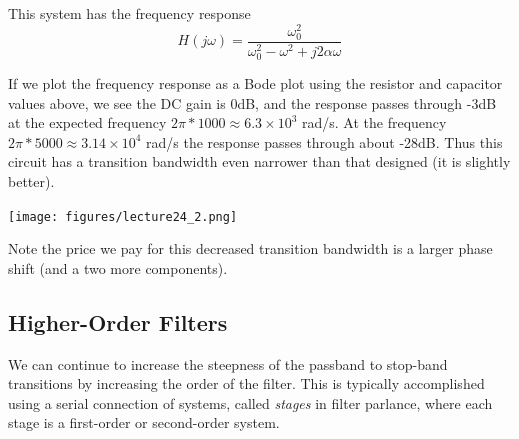 \begin{example}
\begin{center}
  \end{center}
  
  This system has the frequency response
    \[
  H(j\omega) = \frac{\omega_0^2}{\omega_0^2-\omega^2 + j2\alpha\omega}
  \]

  If we plot the frequency response as a Bode plot using the resistor and capacitor values above, we see the DC gain is 0dB, and the response passes through -3dB at the expected frequency $2\pi*1000 \approx 6.3\times 10^3$ rad/s. At the frequency $2\pi*5000 \approx 3.14\times 10^4$ rad/s the response passes through about -28dB. Thus this circuit has a transition bandwidth even narrower than that designed (it is slightly better). 
  \begin{center}
    \texttt{[image: figures/lecture24\_2.png]}
  \end{center}
  Note the price we pay for this decreased transition bandwidth is a larger phase shift (and a two more components).
\end{example}

\subsection{Higher-Order Filters}

We can continue to increase the steepness of the passband to stop-band transitions by increasing the order of the filter. This is typically accomplished using a serial connection of systems, called \emph{stages} in filter parlance, where each stage is a first-order or second-order system.

